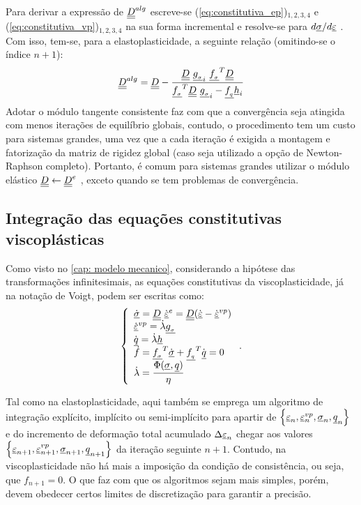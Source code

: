 Para derivar a expressão de $\underline{\underline D}^{alg}$  escreve-se (\ref{eq:constitutiva_ep})$_{1,2,3,4}$ e (\ref{eq:constitutiva_vp})$_{1,2,3,4}$ na sua forma incremental e resolve-se para $d\underline \sigma/d\underline{\varepsilon}$  \cite[p. 285]{Belytschko2000}. Com isso, tem-se, para a elastoplasticidade, a seguinte relação (omitindo-se o índice $n+1$):
\begin{equation}
	\label{eq:D_alg_ep}
	\underline{\underline D}^{alg} = \underline{\underline D} - \dfrac{\underline{\underline D}~\underline{g_{_\sigma}}_i~\underline{f_{_\sigma}}^T \underline{\underline D}}{\underline{f_{_\sigma}}^T\underline{\underline D}~\underline{g_{_\sigma}}_i-\underline{f_{_q}} \underline h_i}
\end{equation}
Adotar o módulo tangente consistente faz com que a convergência seja atingida com menos iterações de equilíbrio globais, contudo, o procedimento tem um custo para sistemas grandes, uma vez que a cada iteração é exigida a montagem e fatorização da matriz de rigidez global (caso seja utilizado a opção de Newton-Raphson completo). Portanto, é comum para sistemas grandes utilizar o módulo elástico $\underline{\underline D} \leftarrow \underline{\underline D}^e$ , exceto quando se tem problemas de convergência.

\subsection{Integração das equações constitutivas viscoplásticas}

Como visto no \autoref{cap: modelo mecanico}, considerando a hipótese das transformações infinitesimais, as equações constitutivas da viscoplasticidade, já na notação de Voigt, podem ser escritas como:
\begin{equation}
	\label{eq:constitutiva_vp}
	\left\{
	\begin{array}{lcl}
		\dot {\underline \sigma} = \underline{\underline D}~\dot {\underline{\varepsilon}}^e = \underline{\underline D}(\dot {\underline{\varepsilon}} - \dot {\underline{\varepsilon}}^{vp}) \\
		\dot {\underline{\varepsilon}}^{vp} = \dot \lambda \underline{g_{_\sigma}} \\
		\dot {\underline q} = \dot \lambda \underline h \\
		\dot f = \underline{f_{_\sigma}}^T \dot {\underline \sigma} + \underline{f_{_q}}^T \dot {\underline q} = 0 \\
		\dot \lambda =  \dfrac{\Phi(\underline \sigma, \underline q)}{\eta}	
	\end{array}
	\right..
\end{equation}

Tal como na elastoplasticidade, aqui também se emprega um algoritmo de integração explícito, implícito ou semi-implícito para apartir de $\left\{ \underline{\varepsilon}_n, \underline{\varepsilon}_n^{vp},\underline \sigma_n,\underline q_n \right\}$ e do incremento de deformação total acumulado $\Delta \underline{\varepsilon}_n$ chegar aos valores $\left\{ \underline{\varepsilon}_{n+1}, \underline{\varepsilon}_{n+1}^{vp},\underline \sigma_{n+1},\underline q_{n+1} \right\}$  da iteração seguinte $n+1$. Contudo, na viscoplasticidade não há mais a imposição da condição de consistência, ou seja, que $f_{n+1} = 0$. O que faz com que os algoritmos sejam mais simples, porém, devem obedecer certos limites de discretização para garantir a precisão.

